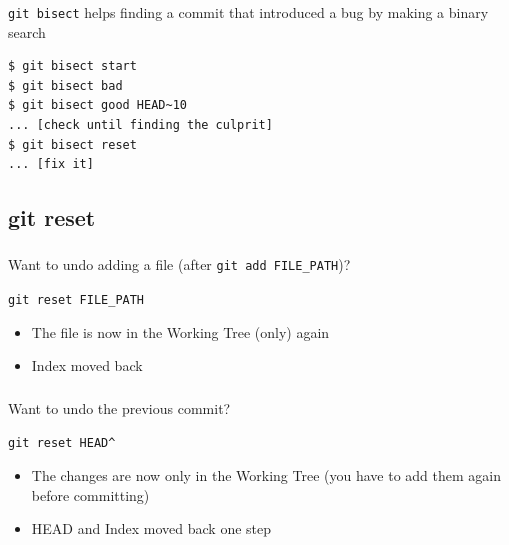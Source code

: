 
\begin{frame}[fragile]
  \frametitle{\insertsubsection}

  \begin{center}
    \texttt{git bisect} helps finding a commit that introduced a bug by making a binary search
  \end{center}

  \begin{small}
\begin{verbatim}
$ git bisect start
$ git bisect bad
$ git bisect good HEAD~10
... [check until finding the culprit]
$ git bisect reset
... [fix it]
\end{verbatim}
  \end{small}

\end{frame}


\subsection{git reset}

\begin{frame}
  \begin{center}
    \textbf{\Huge{\insertsubsection}}
  \end{center}
\end{frame}


\begin{frame}
  \frametitle{\insertsubsection}

  Want to undo adding a file (after \texttt{git add FILE\_PATH})?\\

  \begin{center}
  \texttt{git reset FILE\_PATH}
  \end{center}

  \begin{itemize}
    \item The file is now in the Working Tree (only) again
    \item Index moved back
  \end{itemize}

\end{frame}


\begin{frame}
  \frametitle{\insertsubsection}

  Want to undo the previous commit?\\
  \begin{center}
  \texttt{git reset HEAD\^}
  \end{center}

  \begin{itemize}
    \item The changes are now only in the Working Tree (you have to add them again before committing)
    \item HEAD and Index moved back one step
  \end{itemize}

\end{frame}

